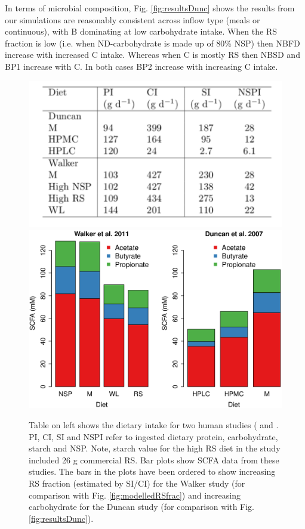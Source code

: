 \documentclass[a4paper]{article}
\begin{document}
In terms of microbial composition, Fig. \ref{fig:resultsDunc} shows the results from our simulations are reasonably consistent across inflow type (meals or continuous), with B dominating at low carbohydrate intake.
When the RS fraction is low (i.e. when ND-carbohydrate is made up of 80\% NSP) then NBFD increase with increased C intake. 
Whereas when C is mostly RS then NBSD and BP1 increase with C. In both cases BP2 increase with increasing C intake.

\begin{figure}
    \centering
    \includegraphics[scale=0.4]{images/Table3.pdf}
    \includegraphics[scale=0.24]{images/InVivoExptsNew.eps}
    \caption{Table on left shows the dietary intake for two human studies (\cite{duncan} and \cite{walker2011}. PI, CI, SI and NSPI refer to ingested dietary protein, carbohydrate, starch and NSP. Note, starch value for the high RS diet in the \cite{walker2011} study included 26 g commercial RS. Bar plots show SCFA data from these studies. The bars in the plots have been ordered to show increasing RS fraction (estimated by SI/CI) for the Walker study (for comparison with Fig. \ref{fig:modelledRSfrac}) and increasing carbohydrate for the Duncan study (for comparison with Fig. \ref{fig:resultsDunc}).
    }
    \label{fig:Invivo}
\end{figure}
\end{document}
